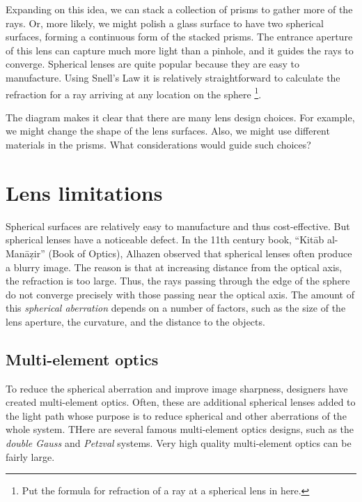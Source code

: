 \documentclass[
  letterpaper,
]{book}
\begin{document}
Expanding on this idea, we can stack a collection of prisms to gather
more of the rays. Or, more likely, we might polish a glass surface to
have two spherical surfaces, forming a continuous form of the stacked
prisms. The entrance aperture of this lens can capture much more light
than a pinhole, and it guides the rays to converge. Spherical lenses are
quite popular because they are easy to manufacture. Using Snell's Law it
is relatively straightforward to calculate the refraction for a ray
arriving at any location on the sphere \footnote{Put the formula for
  refraction of a ray at a spherical lens in here.}.

The diagram makes it clear that there are many lens design choices. For
example, we might change the shape of the lens surfaces. Also, we might
use different materials in the prisms. What considerations would guide
such choices?

\section{Lens limitations}\label{lens-limitations}

Spherical surfaces are relatively easy to manufacture and thus
cost-effective. But spherical lenses have a noticeable defect. In the
11th century book, ``Kitāb al-Manāẓir'' (Book of Optics), Alhazen
observed that spherical lenses often produce a blurry image. The reason
is that at increasing distance from the optical axis, the refraction is
too large. Thus, the rays passing through the edge of the sphere do not
converge precisely with those passing near the optical axis. The amount
of this \emph{spherical aberration} depends on a number of factors, such
as the size of the lens aperture, the curvature, and the distance to the
objects.

\subsection{Multi-element optics}\label{multi-element-optics}

To reduce the spherical aberration and improve image sharpness,
designers have created multi-element optics. Often, these are additional
spherical lenses added to the light path whose purpose is to reduce
spherical and other aberrations of the whole system. THere are several
famous multi-element optics designs, such as the \emph{double Gauss} and
\emph{Petzval} systems. Very high quality multi-element optics can be
fairly large.
\end{document}

